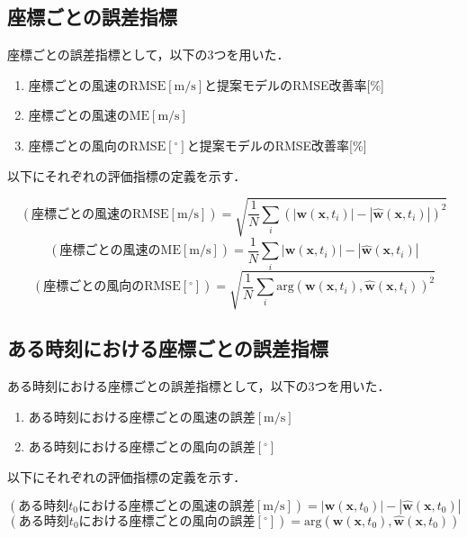 \subsection{座標ごとの誤差指標 \label{subsection:exp-metrics-per-point}}
座標ごとの誤差指標として，以下の3つを用いた．

\begin{enumerate}
  \item 座標ごとの風速の$\mathrm{RMSE[m/s]}$と提案モデルのRMSE改善率[\%]
  \item 座標ごとの風速の$\mathrm{ME[m/s]}$
  \item 座標ごとの風向の$\mathrm{RMSE[^\circ]}$と提案モデルのRMSE改善率[\%]
\end{enumerate}

以下にそれぞれの評価指標の定義を示す．

\begin{equation}
  (\mathrm{座標ごとの風速のRMSE [m/s]}) = \sqrt{\frac{1}{N} \sum_{i} (|\bm{w}(\bm{x}, t_i)| - |\hat{\bm{w}}(\bm{x}, t_i)|)^2}
  \label{eq:exp-rmse-per-point}
\end{equation}
\begin{equation}
  (\mathrm{座標ごとの風速のME [m/s]}) = \frac{1}{N} \sum_{i} |\bm{w}(\bm{x}, t_i)| - |\hat{\bm{w}}(\bm{x}, t_i)|
  \label{eq:exp-me-per-point}
\end{equation}
\begin{equation}
  (\mathrm{座標ごとの風向のRMSE [^\circ]}) = \sqrt{\frac{1}{N} \sum_{i} \mathrm{arg}(\bm{w}(\bm{x}, t_i), \hat{\bm{w}}(\bm{x}, t_i))^2}
  \label{eq:exp-rmse-direction-per-point}
\end{equation}

\subsection{ある時刻における座標ごとの誤差指標 \label{subsection:exp-metrics-per-point-at-time}}
ある時刻における座標ごとの誤差指標として，以下の3つを用いた．

\begin{enumerate}
  \item ある時刻における座標ごとの風速の誤差$\mathrm{[m/s]}$
  \item ある時刻における座標ごとの風向の誤差$\mathrm{[^\circ]}$
\end{enumerate}

以下にそれぞれの評価指標の定義を示す． 

\begin{equation}
  (\mathrm{ある時刻}t_0\mathrm{における座標ごとの風速の誤差 [m/s]}) = |\bm{w}(\bm{x}, t_0)| - |\hat{\bm{w}}(\bm{x}, t_0)|
  \label{eq:exp-me-per-point-at-time}
\end{equation}
\begin{equation}
  (\mathrm{ある時刻}t_0\mathrm{における座標ごとの風向の誤差 [^\circ]}) = \mathrm{arg}(\bm{w}(\bm{x}, t_0), \hat{\bm{w}}(\bm{x}, t_0))
  \label{eq:exp-rmse-direction-per-point-at-time}
\end{equation}


